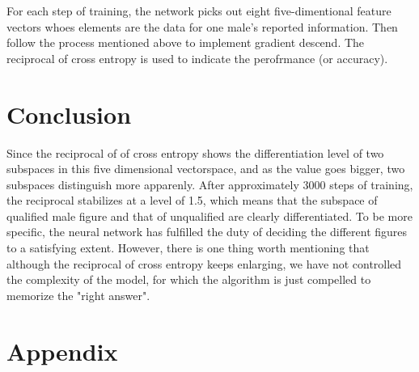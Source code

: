 \documentclass{article}
\begin{document}
\begin{spacing}{2}
    \noindent For each step of training, the network picks out eight five-dimentional feature vectors whoes elements are the data for one male's reported information. Then follow the process mentioned above to implement gradient descend. The reciprocal of cross entropy is used to indicate the perofrmance (or accuracy). 

    

    \section{Conclusion}
    Since the reciprocal of of cross entropy shows the differentiation level of two subspaces in this five dimensional vectorspace, and as the value goes bigger, two subspaces distinguish more apparenly. After approximately 3000 steps of training, the reciprocal stabilizes at a level of 1.5, which means that the subspace of qualified male figure and that of unqualified are clearly differentiated. To be more specific, the neural network has fulfilled the  duty of deciding the different figures to a satisfying extent.
    However, there is one thing worth mentioning that although the reciprocal of cross entropy keeps enlarging, we have not controlled the complexity of the model, for which the algorithm is just compelled to memorize the "right answer".

    \section{Appendix}


\end{spacing}
\end{document}
